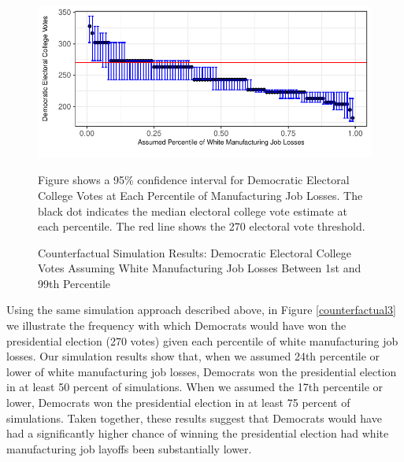 \documentclass[]{AEA}
\begin{document}
\FloatBarrier
\begin{figure} 

\caption{Counterfactual Simulation Results: Democratic Electoral College Votes Assuming White Manufacturing Job Losses Between 1st and 99th Percentile }
\label{counterfactual2}

\begin{center}\includegraphics{Final-Draft_files/figure-latex/unnamed-chunk-7-1} \end{center}



\FloatBarrier
\begin{figurenotes}
Figure shows a 95\% confidence interval for Democratic Electoral College Votes at Each Percentile of Manufacturing Job Losses. The black dot indicates the median electoral college vote estimate at each percentile. The red line shows the 270 electoral vote threshold.
\end{figurenotes}
\end{figure}
\FloatBarrier

Using the same simulation approach described above, in Figure
\ref{counterfactual3} we illustrate the frequency with which Democrats
would have won the presidential election (270 votes) given each
percentile of white manufacturing job losses. Our simulation results
show that, when we assumed 24th percentile or lower of white
manufacturing job losses, Democrats won the presidential election in at
least 50 percent of simulations. When we assumed the 17th percentile or
lower, Democrats won the presidential election in at least 75 percent of
simulations. Taken together, these results suggest that Democrats would
have had a significantly higher chance of winning the presidential
election had white manufacturing job layoffs been substantially lower.
\end{document}
